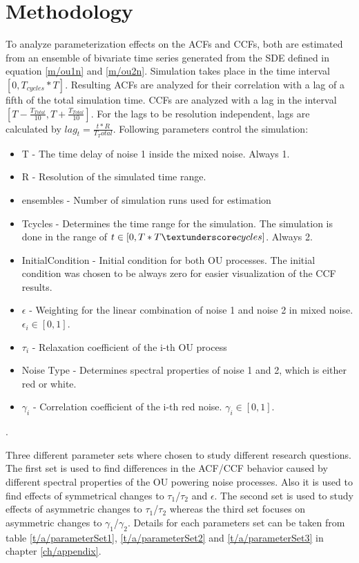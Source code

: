 \documentclass[a4paper,12pt]{book}
\theoremstyle{break}
\begin{document}

\chapter{Methodology}\label{ch/methodology}
To analyze parameterization effects on the \ac{ACF}s and \ac{CCF}s, both are estimated from an ensemble of bivariate time series generated from the \ac{SDE} defined in equation \ref{m/ou1n} and \ref{m/ou2n}. 
Simulation takes place in the time interval $[0, T_{cycles }* T]$.
Resulting \acf{ACF}s are analyzed for their correlation with a lag of a fifth of the total simulation time. 
\ac{CCF}s are analyzed with a lag in the interval $[T - \frac{T_{Total}}{10}, T + \frac{T_{Total}}{10}]$.
For the lags to be resolution independent, lags are calculated by $lag_t=\frac{t*R}{T_Total}$.
Following parameters control the simulation:

\begin{itemize}
	\item T - The time delay of noise 1 inside the mixed noise. Always 1.
	\item R - Resolution of the simulated time range.
	\item ensembles - Number of simulation runs used for estimation
	\item T\textunderscore cycles - Determines the time range for the simulation. The simulation is done in the range of $t\in[0, T*T\textunderscore cycles]  $. Always 2.
	\item Initial\textunderscore Condition - Initial condition for both \ac{OU} processes. The initial condition was chosen to be always zero for easier visualization of the \ac{CCF} results.
	\item $\epsilon$ - Weighting for the linear combination of noise 1 and noise 2 in mixed noise. $\epsilon_i \in [0, 1]$.
	\item $\tau_i$ - Relaxation coefficient of the i-th \ac{OU} process
	\item Noise Type - Determines spectral properties of noise 1 and 2, which is either red or white.
	\item $\gamma_i$ - Correlation coefficient of the i-th red noise. $\gamma_i \in [0, 1]$.
\end{itemize}.

Three different parameter sets where chosen to study different research questions. The first set is used to find differences in the \ac{ACF}/\ac{CCF} behavior caused by different spectral properties of the OU powering noise processes. Also it is used to find effects of symmetrical changes to $\tau_1$/$\tau_2$ and $\epsilon$. The second set is used to study effects of asymmetric changes to $\tau_1$/$\tau_2$ whereas the third set focuses on asymmetric changes to $\gamma_1$/$\gamma_2$.
Details for each parameters set can be taken from table \ref{t/a/parameterSet1}, \ref{t/a/parameterSet2} and \ref{t/a/parameterSet3} in chapter \ref{ch/appendix}.
\end{document}
